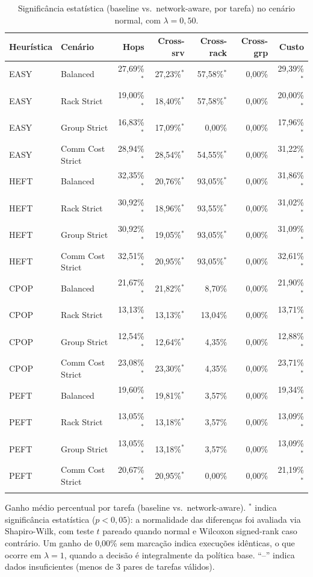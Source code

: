 \begin{table}[htbp]
\centering
\small
\caption{Significância estatística (baseline vs.\ network-aware, por tarefa) no cenário normal, com $\lambda = 0{,}50$.}
\label{tab:significancia_normal_lambda_050}
\begin{tabular}{llrrrrr}
\toprule
Heurística & Cenário & Hops & Cross-srv & Cross-rack & Cross-grp & Custo \\
\midrule
EASY & Balanced & 27,69\%$^{*}$ & 27,23\%$^{*}$ & 57,58\%$^{*}$ & 0,00\% & 29,39\%$^{*}$ \\
EASY & Rack Strict & 19,00\%$^{*}$ & 18,40\%$^{*}$ & 57,58\%$^{*}$ & 0,00\% & 20,00\%$^{*}$ \\
EASY & Group Strict & 16,83\%$^{*}$ & 17,09\%$^{*}$ & 0,00\% & 0,00\% & 17,96\%$^{*}$ \\
EASY & Comm Cost Strict & 28,94\%$^{*}$ & 28,54\%$^{*}$ & 54,55\%$^{*}$ & 0,00\% & 31,22\%$^{*}$ \\
\addlinespace
HEFT & Balanced & 32,35\%$^{*}$ & 20,76\%$^{*}$ & 93,05\%$^{*}$ & 0,00\% & 31,86\%$^{*}$ \\
HEFT & Rack Strict & 30,92\%$^{*}$ & 18,96\%$^{*}$ & 93,55\%$^{*}$ & 0,00\% & 31,02\%$^{*}$ \\
HEFT & Group Strict & 30,92\%$^{*}$ & 19,05\%$^{*}$ & 93,05\%$^{*}$ & 0,00\% & 31,09\%$^{*}$ \\
HEFT & Comm Cost Strict & 32,51\%$^{*}$ & 20,95\%$^{*}$ & 93,05\%$^{*}$ & 0,00\% & 32,61\%$^{*}$ \\
\addlinespace
CPOP & Balanced & 21,67\%$^{*}$ & 21,82\%$^{*}$ & 8,70\% & 0,00\% & 21,90\%$^{*}$ \\
CPOP & Rack Strict & 13,13\%$^{*}$ & 13,13\%$^{*}$ & 13,04\% & 0,00\% & 13,71\%$^{*}$ \\
CPOP & Group Strict & 12,54\%$^{*}$ & 12,64\%$^{*}$ & 4,35\% & 0,00\% & 12,88\%$^{*}$ \\
CPOP & Comm Cost Strict & 23,08\%$^{*}$ & 23,30\%$^{*}$ & 4,35\% & 0,00\% & 23,71\%$^{*}$ \\
\addlinespace
PEFT & Balanced & 19,60\%$^{*}$ & 19,81\%$^{*}$ & 3,57\% & 0,00\% & 19,34\%$^{*}$ \\
PEFT & Rack Strict & 13,05\%$^{*}$ & 13,18\%$^{*}$ & 3,57\% & 0,00\% & 13,09\%$^{*}$ \\
PEFT & Group Strict & 13,05\%$^{*}$ & 13,18\%$^{*}$ & 3,57\% & 0,00\% & 13,09\%$^{*}$ \\
PEFT & Comm Cost Strict & 20,67\%$^{*}$ & 20,95\%$^{*}$ & 0,00\% & 0,00\% & 21,19\%$^{*}$ \\
\addlinespace
\bottomrule
\end{tabular}

\vspace{2mm}
\footnotesize Ganho médio percentual por tarefa (baseline vs.\ network-aware). $^{*}$ indica significância estatística ($p<0{,}05$): a normalidade das diferenças foi avaliada via Shapiro-Wilk, com teste $t$ pareado quando normal e Wilcoxon signed-rank caso contrário. Um ganho de 0,00\% sem marcação indica execuções idênticas, o que ocorre em $\lambda = 1$, quando a decisão é integralmente da política base. ``--'' indica dados insuficientes (menos de 3 pares de tarefas válidos).
\end{table}
